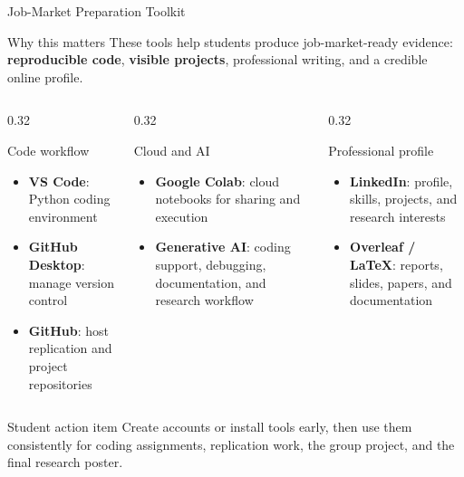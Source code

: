 \documentclass[aspectratio=169,11pt]{beamer}
\begin{document}
\begin{frame}{Job-Market Preparation Toolkit}
\small
\begin{block}{Why this matters}
These tools help students produce job-market-ready evidence: \textbf{reproducible code}, \textbf{visible projects}, professional writing, and a credible online profile.
\end{block}

\vspace{0.15em}
\begin{columns}[T,onlytextwidth]
\begin{column}{0.32\textwidth}
\begin{block}{Code workflow}
\scriptsize
\begin{itemize}
    \item \textbf{VS Code}: Python coding environment
    \item \textbf{GitHub Desktop}: manage version control
    \item \textbf{GitHub}: host replication and project repositories
\end{itemize}
\end{block}
\end{column}
\begin{column}{0.32\textwidth}
\begin{block}{Cloud and AI}
\scriptsize
\begin{itemize}
    \item \textbf{Google Colab}: cloud notebooks for sharing and execution
    \item \textbf{Generative AI}: coding support, debugging, documentation, and research workflow
\end{itemize}
\end{block}
\end{column}
\begin{column}{0.32\textwidth}
\begin{block}{Professional profile}
\scriptsize
\begin{itemize}
    \item \textbf{LinkedIn}: profile, skills, projects, and research interests
    \item \textbf{Overleaf / LaTeX}: reports, slides, papers, and documentation
\end{itemize}
\end{block}
\end{column}
\end{columns}

\vspace{0.15em}
\begin{alertblock}{Student action item}
\scriptsize
Create accounts or install tools early, then use them consistently for coding assignments, replication work, the group project, and the final research poster.
\end{alertblock}
\end{frame}
\end{document}
